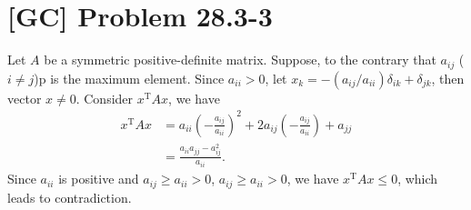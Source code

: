 \documentclass[a4paper,11pt]{article}
\begin{document}
  \section{[GC] Problem 28.3-3}
  Let $A$ be a symmetric positive-definite matrix. Suppose, to the contrary that $a_{ij}$ ($i \neq j$)p is the maximum element. Since $a_{ii} > 0$, let $x_k = -(a_{ij}/a_{ii})\delta_{ik} + \delta_{jk}$, then vector $x \neq 0$. Consider $x^{\text{T}}Ax$, we have
  \begin{align*}
    x^{\text{T}}Ax &= a_{ii}\left(-\frac{a_{ij}}{a_{ii}}\right)^2 + 2a_{ij}\left(-\frac{a_{ij}}{a_{ii}}\right) + a_{jj} \\
    &= \frac{a_{ii}a_{jj}-a_{ij}^2}{a_{ii}}.
  \end{align*}
  Since $a_{ii}$ is positive and $a_{ij} \geq a_{ii} > 0$, $a_{ij} \geq a_{ii} > 0$, we have $x^{\text{T}}Ax \leq 0$, which leads to contradiction.
  
\end{document}
